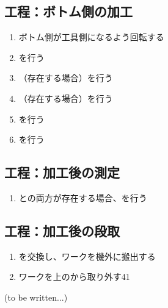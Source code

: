 \clearpage
\subsection{工程：ボトム側の加工}
\begin{enumerate}[label*=\sarrow]
\item ボトム側が工具側になるよう回転する
\item \BottomEndFacecutMilling を行う
\item （存在する場合）\BottomOutcutMilling を行う
\item （存在する場合）\BottomCurvedOutcutMilling を行う
\item \BottomEndFaceOutCChamferMilling を行う
\item \BottomEndFaceInCChamferMilling を行う
\end{enumerate}


\subsection{工程：加工後の測定}
\begin{enumerate}[label*=\sarrow]
\item \TopOutcut と\BottomOutcut の両方が存在する場合、\CenterlineEndFaceDifMeasurement を行う
\end{enumerate}


\subsection{工程：加工後の段取}
\begin{enumerate}[label*=\sarrow]
\item \Palette を交換し、ワークを機外に搬出する
\item ワークを\Table 上の\Jig から取り外す41
\end{enumerate}



\clearpage
(to be written...)



